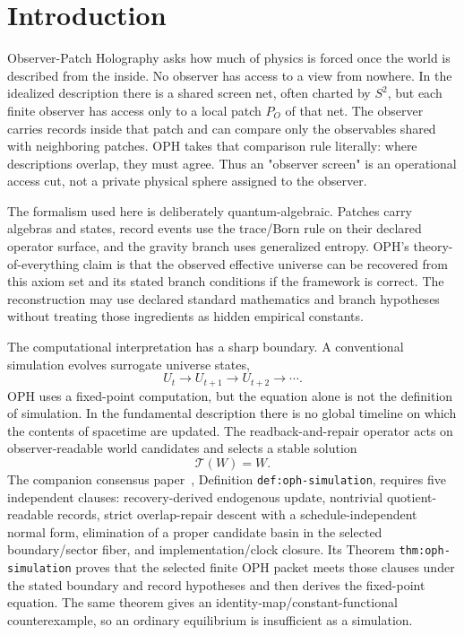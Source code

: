 \documentclass[11pt]{article}
\begin{document}
\tableofcontents
\newpage

\section{Introduction}

Observer-Patch Holography asks how much of physics is forced once the world is described from the
inside. No observer has access to a view from nowhere. In the idealized description there is a
shared screen net, often charted by \(S^2\), but each finite observer has access only to a local
patch \(P_O\) of that net. The observer carries records inside that patch and can compare only the
observables shared with neighboring patches. OPH takes that comparison rule literally: where
descriptions overlap, they must agree. Thus an "observer screen" is an operational access cut, not a
private physical sphere assigned to the observer.

The formalism used here is deliberately quantum-algebraic. Patches carry algebras and states,
record events use the trace/Born rule on their declared operator surface, and the gravity branch
uses generalized entropy. OPH's theory-of-everything claim is that the observed effective universe
can be recovered from this axiom set and its stated branch conditions if the framework is correct.
The reconstruction may use declared standard mathematics and branch hypotheses without treating
those ingredients as hidden empirical constants.

The computational interpretation has a sharp boundary. A conventional simulation evolves surrogate
universe states,
\[
U_t\longrightarrow U_{t+1}\longrightarrow U_{t+2}\longrightarrow\cdots .
\]
OPH uses a fixed-point computation, but the equation alone is not the definition of
simulation. In the fundamental description there is no global timeline on which the contents
of spacetime are updated. The readback-and-repair operator acts on observer-readable world
candidates and selects a stable solution
\[
\mathcal T(W)=W .
\]
The companion consensus paper~\cite{ophconsensus}, Definition
\texttt{def:oph-simulation}, requires five independent clauses: recovery-derived endogenous
update, nontrivial quotient-readable records, strict overlap-repair descent with a
schedule-independent normal form, elimination of a proper candidate basin in the selected
boundary/sector fiber, and implementation/clock closure. Its Theorem
\texttt{thm:oph-simulation} proves that the selected finite OPH packet meets those clauses
under the stated boundary and record hypotheses and then derives the fixed-point equation.
The same theorem gives an identity-map/constant-functional counterexample, so an ordinary
equilibrium is insufficient as a simulation.
\end{document}
